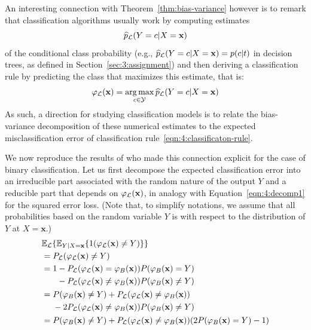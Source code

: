 An interesting connection with Theorem~\ref{thm:bias-variance} however is to
remark that classification algorithms usually work by computing estimates
\begin{equation}
\widehat{p}_{\cal L}(Y=c|X=\mathbf{x})
\end{equation}
of the conditional class probability (e.g.,
$\widehat{p}_{\cal L}(Y=c|X=\mathbf{x}) = p(c|t)$ in decision trees, as defined in Section~\ref{sec:3:assignment}) and then deriving a classification rule by
predicting the class that maximizes this estimate, that is:
\begin{equation}\label{eqn:4:classificaton-rule}
\varphi_{\cal L}(\mathbf{x}) = \operatorname*{arg\,max}_{c \in {\cal Y}} \widehat{p}_{\cal L}(Y=c|X=\mathbf{x})
\end{equation}
As such, a direction for studying classification models is to relate the
bias-variance decomposition of these numerical estimates to the expected
misclassification error of classification rule~\ref{eqn:4:classificaton-rule}.

We now reproduce the results of \citet{friedman:1997} who made this connection
explicit for the case of binary classification. Let us first decompose the
expected classification error into an irreducible part associated with the
random nature of the output $Y$ and a reducible part that depends on
$\varphi_{\cal L}(\mathbf{x})$, in analogy with Equation~\ref{eqn:4:decomp1}
for the squared error loss. (Note that, to simplify notations, we assume that
all probabilities based on the random variable $Y$ is with respect to the
distribution of $Y$ at $X=\mathbf{x}$.)
\begin{align}
& \mathbb{E}_{\cal L}\{ \mathbb{E}_{Y|X=\mathbf{x}} \{ 1(\varphi_{\cal L}(\mathbf{x}) \neq Y) \} \}  \\
&= P_{{\cal L}}(\varphi_{\cal L}(\mathbf{x}) \neq Y) \nonumber \\
&= \begin{aligned}[t]
    1 &- P_{\cal L}(\varphi_{\cal L}(\mathbf{x}) = \varphi_B(\mathbf{x})) P(\varphi_B(\mathbf{x})=Y) \nonumber \\
      &- P_{\cal L}(\varphi_{\cal L}(\mathbf{x}) \neq \varphi_B(\mathbf{x})) P(\varphi_B(\mathbf{x})\neq Y) \nonumber
   \end{aligned}\nonumber \\
&= \begin{aligned}[t]
    &P(\varphi_B(\mathbf{x})\neq Y) + P_{\cal L}(\varphi_{\cal L}(\mathbf{x})\neq \varphi_B(\mathbf{x})) \nonumber \\
    &- 2 P_{\cal L}(\varphi_{\cal L}(\mathbf{x})\neq \varphi_B(\mathbf{x})) P(\varphi_B(\mathbf{x})\neq Y)  \nonumber \\
   \end{aligned}\nonumber \\
&= P(\varphi_B(\mathbf{x})\neq Y) + P_{\cal L}(\varphi_{\cal L}(\mathbf{x})\neq \varphi_B(\mathbf{x}))(2 P(\varphi_B(\mathbf{x}) = Y) - 1) \nonumber
\end{align}

